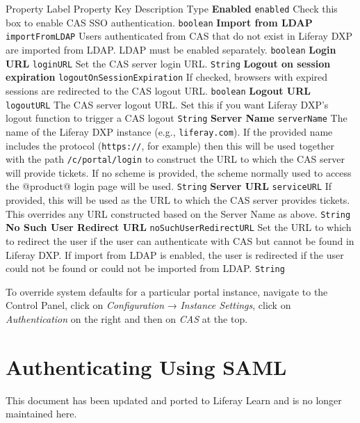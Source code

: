 Property Label \textbar{} Property Key \textbar{} Description \textbar{}
Type \textbf{Enabled} \textbar{} \texttt{enabled} \textbar{} Check this
box to enable CAS SSO authentication. \textbar{} \texttt{boolean}
\textbf{Import from LDAP} \textbar{} \texttt{importFromLDAP} \textbar{}
Users authenticated from CAS that do not exist in Liferay DXP are
imported from LDAP. LDAP must be enabled separately. \textbar{}
\texttt{boolean} \textbf{Login URL} \textbar{} \texttt{loginURL}
\textbar{} Set the CAS server login URL. \textbar{} \texttt{String}
\textbf{Logout on session expiration} \textbar{}
\texttt{logoutOnSessionExpiration} \textbar{} If checked, browsers with
expired sessions are redirected to the CAS logout URL. \textbar{}
\texttt{boolean} \textbf{Logout URL} \textbar{} \texttt{logoutURL}
\textbar{} The CAS server logout URL. Set this if you want Liferay DXP's
logout function to trigger a CAS logout \textbar{} \texttt{String}
\textbf{Server Name} \textbar{} \texttt{serverName} \textbar{} The name
of the Liferay DXP instance (e.g., \texttt{liferay.com}). If the
provided name includes the protocol (\texttt{https://}, for example)
then this will be used together with the path \texttt{/c/portal/login}
to construct the URL to which the CAS server will provide tickets. If no
scheme is provided, the scheme normally used to access the @product@
login page will be used. \textbar{} \texttt{String} \textbf{Server URL}
\textbar{} \texttt{serviceURL} \textbar{} If provided, this will be used
as the URL to which the CAS server provides tickets. This overrides any
URL constructed based on the Server Name as above. \textbar{}
\texttt{String} \textbf{No Such User Redirect URL} \textbar{}
\texttt{noSuchUserRedirectURL} \textbar{} Set the URL to which to
redirect the user if the user can authenticate with CAS but cannot be
found in Liferay DXP. If import from LDAP is enabled, the user is
redirected if the user could not be found or could not be imported from
LDAP. \textbar{} \texttt{String}

To override system defaults for a particular portal instance, navigate
to the Control Panel, click on \emph{Configuration} → \emph{Instance
Settings}, click on \emph{Authentication} on the right and then on
\emph{CAS} at the top.

\chapter{Authenticating Using SAML}\label{authenticating-using-saml}

{This document has been updated and ported to Liferay Learn and is no
longer maintained here.}

